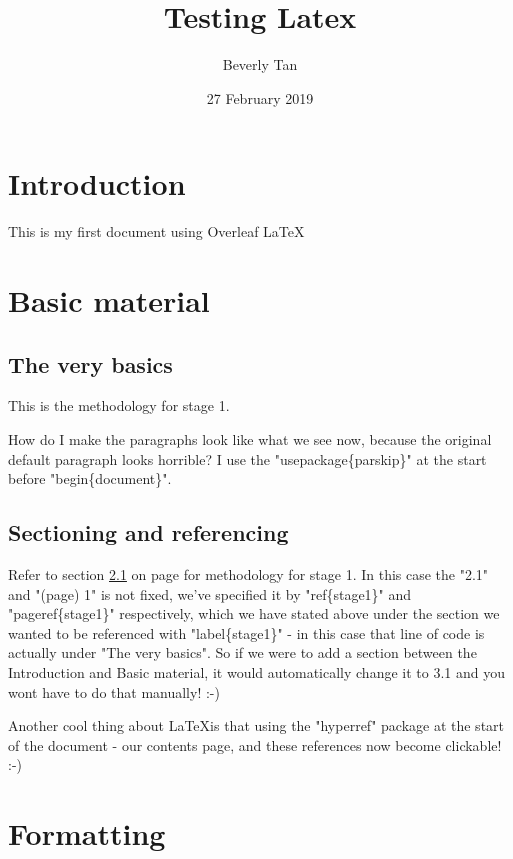 \documentclass[a4paper, 12pt]{article}
\begin{document}
\title{Testing Latex}
\author{Beverly Tan}
\date{27 February 2019}
\maketitle

\tableofcontents
\newpage
{}

\section{Introduction}

This is my first document using Overleaf \LaTeX

\section{Basic material}

\subsection{The very basics}
\label{stage1}

This is the methodology for stage 1. 

How do I make the paragraphs look like what we see now, because the original default paragraph looks horrible? I use the "usepackage\{parskip\}" at the start before "begin\{document\}". 

\subsection{Sectioning and referencing}

Refer to section \ref{stage1} on page \pageref{stage1} for methodology for stage 1. In this case the "2.1" and "(page) 1" is not fixed, we've specified it by "ref\{stage1\}" and "pageref\{stage1\}" respectively, which we have stated above under the section we wanted to be referenced with "label\{stage1\}" - in this case that line of code is actually under "The very basics". So if we were to add a section between the Introduction and Basic material, it would automatically change it to 3.1 and you wont have to do that manually! :-) 

Another cool thing about \LaTeX is that using the "hyperref" package at the start of the document - our contents page, and these references now become clickable! :-) 

\newpage

\section{Formatting}
\end{document}
